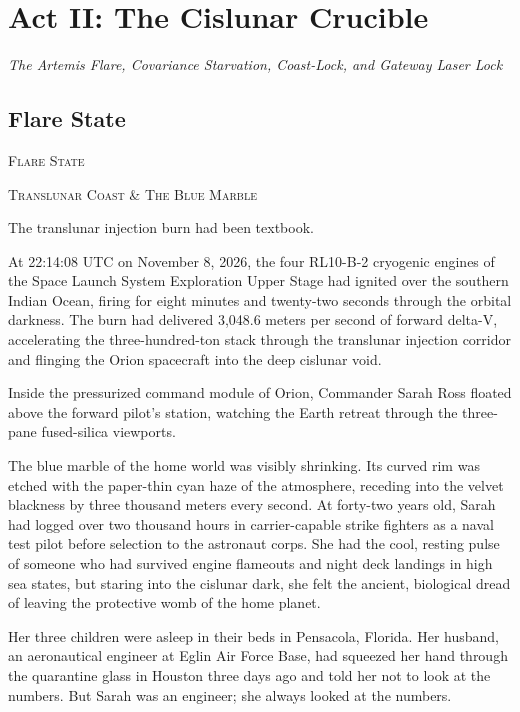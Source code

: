 \documentclass[12pt,twoside,openright]{book}
\newcommand{\sceneheader}[1]{%
  \par\vspace{1.8em}%
  {\noindent\centering\scshape\large #1\par}%
  \vspace{1.0em}%
  \noindent%
}
\begin{document}
\cleardoublepage
\part{Act II: The Cislunar Crucible}
\begin{center}\large\itshape The Artemis Flare, Covariance Starvation, Coast-Lock, and Gateway Laser Lock\end{center}
\vspace*{30pt}
\chapter{Flare State}
\sceneheader{Flare State}

\sceneheader{Translunar Coast \& The Blue
Marble}

The translunar injection burn had been textbook.

At 22:14:08 UTC on November 8, 2026, the four RL10-B-2 cryogenic engines
of the Space Launch System Exploration Upper Stage had ignited over the
southern Indian Ocean, firing for eight minutes and twenty-two seconds
through the orbital darkness. The burn had delivered 3,048.6 meters per
second of forward delta-V, accelerating the three-hundred-ton stack
through the translunar injection corridor and flinging the Orion
spacecraft into the deep cislunar void.

Inside the pressurized command module of Orion, Commander Sarah Ross
floated above the forward pilot's station, watching the Earth retreat
through the three-pane fused-silica viewports.

The blue marble of the home world was visibly shrinking. Its curved rim
was etched with the paper-thin cyan haze of the atmosphere, receding
into the velvet blackness by three thousand meters every second. At
forty-two years old, Sarah had logged over two thousand hours in
carrier-capable strike fighters as a naval test pilot before selection
to the astronaut corps. She had the cool, resting pulse of someone who
had survived engine flameouts and night deck landings in high sea
states, but staring into the cislunar dark, she felt the ancient,
biological dread of leaving the protective womb of the home planet.

Her three children were asleep in their beds in Pensacola, Florida. Her
husband, an aeronautical engineer at Eglin Air Force Base, had squeezed
her hand through the quarantine glass in Houston three days ago and told
her not to look at the numbers. But Sarah was an engineer; she always
looked at the numbers.
\end{document}
